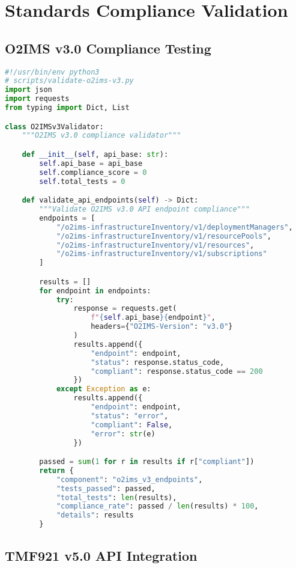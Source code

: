 \documentclass[conference]{IEEEtran}
\begin{document}
\section{Standards Compliance Validation}

\subsection{O2IMS v3.0 Compliance Testing}

\begin{lstlisting}[language=Python]
#!/usr/bin/env python3
# scripts/validate-o2ims-v3.py
import json
import requests
from typing import Dict, List

class O2IMSv3Validator:
    """O2IMS v3.0 compliance validator"""

    def __init__(self, api_base: str):
        self.api_base = api_base
        self.compliance_score = 0
        self.total_tests = 0

    def validate_api_endpoints(self) -> Dict:
        """Validate O2IMS v3.0 API endpoint compliance"""
        endpoints = [
            "/o2ims-infrastructureInventory/v1/deploymentManagers",
            "/o2ims-infrastructureInventory/v1/resourcePools",
            "/o2ims-infrastructureInventory/v1/resources",
            "/o2ims-infrastructureInventory/v1/subscriptions"
        ]

        results = []
        for endpoint in endpoints:
            try:
                response = requests.get(
                    f"{self.api_base}{endpoint}",
                    headers={"O2IMS-Version": "v3.0"}
                )
                results.append({
                    "endpoint": endpoint,
                    "status": response.status_code,
                    "compliant": response.status_code == 200
                })
            except Exception as e:
                results.append({
                    "endpoint": endpoint,
                    "status": "error",
                    "compliant": False,
                    "error": str(e)
                })

        passed = sum(1 for r in results if r["compliant"])
        return {
            "component": "o2ims_v3_endpoints",
            "tests_passed": passed,
            "total_tests": len(results),
            "compliance_rate": passed / len(results) * 100,
            "details": results
        }
\end{lstlisting}

\subsection{TMF921 v5.0 API Integration}
\end{document}
